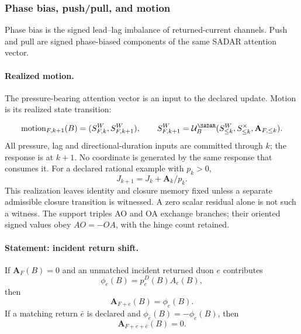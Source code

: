 \subsubsection{Phase bias, push/pull, and motion}
\label{subsec:phase-bias-motion}
Phase bias is the signed lead--lag imbalance of returned-current channels. Push and pull are signed phase-biased components of the same SADAR attention vector.
\paragraph{Realized motion.}
The pressure-bearing attention vector is an input to the declared update.
Motion is its realized state transition:

\begin{equation}
\operatorname{motion}_{F,k+1}(B)=(S^W_{F,k},S^W_{F,k+1}),\qquad
S^W_{F,k+1}=\mathcal U^{\SADAR}_B(S^W_{\le k},S^\times_{\le k},\mathbf A_{F,\le k}).
\label{eq:causal-update}
\end{equation}
All pressure, lag and directional-duration inputs are committed through
\(k\); the response is at \(k+1\). No coordinate is generated by the same
response that consumes it. For a declared rational example with \(p_k>0\),
\begin{equation}
J_{k+1}=J_k+\mathbf A_k/p_k.
\label{eq:sadar-rational-response}
\end{equation}
This realization leaves identity and closure memory fixed unless a separate
admissible closure transition is witnessed. A zero scalar residual alone is
not such a witness. The support triples AO and OA exchange branches; their
oriented signed values obey \(AO=-OA\), with the hinge count retained.\label{eq:ao-oa-oriented-value}

\paragraph{Statement: incident return shift.}
If \(\mathbf A_F(B)=0\) and an unmatched incident returned duon \(e\) contributes
\[
\phi_e(B)=p^D_e(B)A_e(B),
\]
then
\begin{equation}
\mathbf A_{F+e}(B)=\phi_e(B).
\label{eq:incident-return-shift}
\end{equation}
If a matching return \(\bar e\) is declared and \(\phi_{\bar e}(B)=-\phi_e(B)\), then
\begin{equation}
\mathbf A_{F+e+\bar e}(B)=0.
\label{eq:matched-return-cancellation}
\end{equation}


